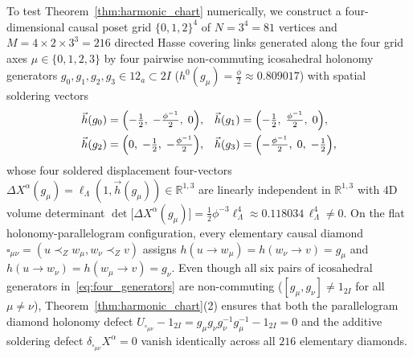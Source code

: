 \documentclass[11pt,a4paper]{article}
\theoremstyle{definition}
\theoremstyle{remark}
\newcommand{\R}{\mathbb{R}}
\begin{document}
To test Theorem~\ref{thm:harmonic_chart} numerically, we construct a four-dimensional causal poset grid $\{0, 1, 2\}^4$ of $N = 3^4 = 81$ vertices and $M = 4 \times 2 \times 3^3 = 216$ directed Hasse covering links generated along the four grid axes $\mu \in \{0, 1, 2, 3\}$ by four pairwise non-commuting icosahedral holonomy generators $g_0, g_1, g_2, g_3 \in 12_a \subset 2I$ ($h^0(g_\mu) = \frac{\phi}{2} \approx 0.809017$) with spatial soldering vectors
\begin{equation}
\label{eq:four_generators}
\begin{aligned}
\vec{h}(g_0) &= \Bigl(-\tfrac{1}{2},\; -\tfrac{\phi^{-1}}{2},\; 0\Bigr), &
\vec{h}(g_1) &= \Bigl(-\tfrac{1}{2},\; \tfrac{\phi^{-1}}{2},\; 0\Bigr), \\
\vec{h}(g_2) &= \Bigl(0,\; -\tfrac{1}{2},\; -\tfrac{\phi^{-1}}{2}\Bigr), &
\vec{h}(g_3) &= \Bigl(-\tfrac{\phi^{-1}}{2},\; 0,\; -\tfrac{1}{2}\Bigr),
\end{aligned}
\end{equation}
whose four soldered displacement four-vectors $\Delta X^\alpha(g_\mu) = \ell_\Lambda(1, \vec{h}(g_\mu)) \in \R^{1,3}$ are linearly independent in $\R^{1,3}$ with $4\text{D}$ volume determinant $\det\bigl[\Delta X^\alpha(g_\mu)\bigr] = \frac{1}{2}\phi^{-3}\ell_\Lambda^4 \approx 0.118034\,\ell_\Lambda^4 \neq 0$. On the flat holonomy-parallelogram configuration, every elementary causal diamond $\square_{\mu\nu} = (u \prec_Z w_\mu, w_\nu \prec_Z v)$ assigns $h(u \to w_\mu) = h(w_\nu \to v) = g_\mu$ and $h(u \to w_\nu) = h(w_\mu \to v) = g_\nu$. Even though all six pairs of icosahedral generators in~\eqref{eq:four_generators} are non-commuting ($[g_\mu, g_\nu] \neq 1_{2I}$ for all $\mu \neq \nu$), Theorem~\ref{thm:harmonic_chart}(2) ensures that both the parallelogram diamond holonomy defect $U_{\square_{\mu\nu}} - 1_{2I} = g_\mu g_\nu g_\nu^{-1} g_\mu^{-1} - 1_{2I} = 0$ and the additive soldering defect $\delta_{\square_{\mu\nu}} X^\alpha = 0$ vanish identically across all $216$ elementary diamonds.
\end{document}
